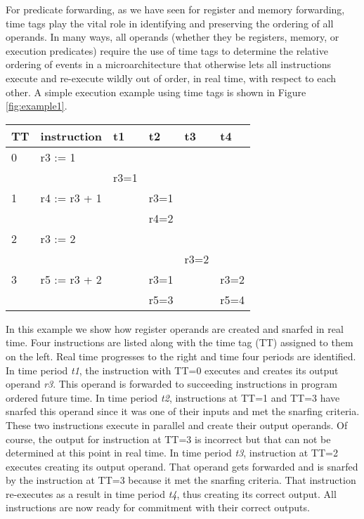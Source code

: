 \documentclass[10pt,twocolumn]{article}
\begin{document}
For predicate forwarding, as we have seen for register and
memory forwarding, time tags play the vital role in
identifying and preserving the ordering of all operands.
In many ways, all operands (whether they be registers, memory,
or execution predicates) require the use of time tags to
determine the relative ordering of events in a microarchitecture
that otherwise lets all instructions execute and re-execute
wildly out of order, in real time, with respect to each other.
A simple execution example using time tags 
is shown in Figure \ref{fig:example1}.
%
\begin{figure*}
\centering
\begin{tabular}{|l|l|l|l|l|l|}
\hline
TT&instruction&t1&t2&t3&t4\\
\hline 
\hline 
0&r3 := 1&&&~~~~&\\
&&r3=1&&&\\
\hline 
1&r4 := r3 + 1&&r3=1&&~~~~\\
&&&r4=2&&\\
\hline 
2&r3 := 2&&&&~~~~\\
&&&&r3=2&\\
\hline 
3&r5 := r3 + 2&&r3=1&&r3=2\\
&&&r5=3&&r5=4\\
\hline 
\end{tabular}
\caption{{\em Example Instruction Execution.} The time tags for sequential
program instructions are on the left.  Real time is show advancing
along the top.  For each real time interval, input operands are shown
above any output operands.}
\label{fig:example1}
\end{figure*}
%
In this example we show how register operands are created and
snarfed in real time.
Four instructions are listed along with the time tag (TT) assigned to them
on the left.  Real time progresses to the right and time four periods
are identified.  In time period \textit{t1}, the instruction with 
TT=0 executes and creates its output operand \textit{r3}.
This operand is forwarded to succeeding instructions in program
ordered future time.  In time period \textit{t2}, instructions
at TT=1 and TT=3 have snarfed this operand since it was one of
their inputs and met the snarfing criteria.  
These two instructions execute in parallel and
create their output operands.  Of course, the output for
instruction at TT=3 is incorrect but that can not be determined
at this point in real time.  In time period \textit{t3},
instruction at TT=2 executes creating its output operand.
That operand gets forwarded and is snarfed by the instruction at
TT=3 because it met the snarfing criteria.  That instruction
re-executes as a result in time period \textit{t4}, thus
creating its correct output.  All instructions are now ready
for commitment with their correct outputs.
%
%
\vspace{-0.25in}
\end{document}
